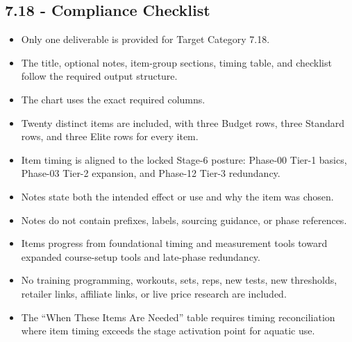 \documentclass[10pt]{article}
\begin{document}
\begin{landscape}
\subsection*{7.18 - Compliance Checklist}
{}

\begin{itemize}
\item Only one deliverable is provided for Target Category 7.18.
\item The title, optional notes, item-group sections, timing table, and checklist follow the required output structure.
\item The chart uses the exact required columns.
\item Twenty distinct items are included, with three Budget rows, three Standard rows, and three Elite rows for every item.
\item Item timing is aligned to the locked Stage-6 posture: Phase-00 Tier-1 basics, Phase-03 Tier-2 expansion, and Phase-12 Tier-3 redundancy.
\item Notes state both the intended effect or use and why the item was chosen.
\item Notes do not contain prefixes, labels, sourcing guidance, or phase references.
\item Items progress from foundational timing and measurement tools toward expanded course-setup tools and late-phase redundancy.
\item No training programming, workouts, sets, reps, new tests, new thresholds, retailer links, affiliate links, or live price research are included.
\item The “When These Items Are Needed” table requires timing reconciliation where item timing exceeds the stage activation point for aquatic use.
\end{itemize}

\end{landscape}
\clearpage
\end{document}
